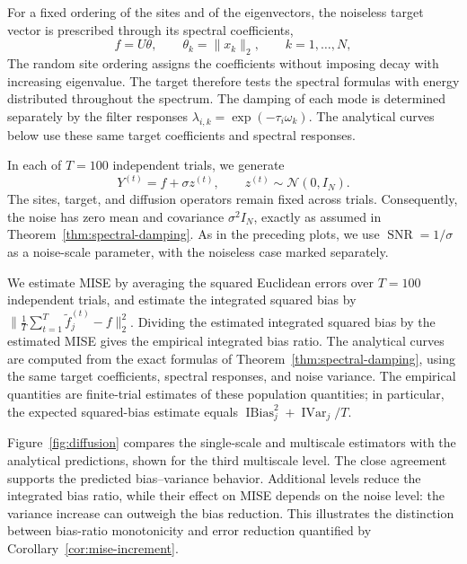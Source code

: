 \documentclass[12pt]{article}
\newcommand{\ibias}{\operatorname{IBias}^2}
\DeclareMathOperator{\ivar}{IVar}
\begin{document}
For a fixed ordering of the sites and of the eigenvectors, the noiseless target vector is prescribed through its spectral coefficients,
\[
f=U\theta,
\qquad
\theta_k=\|x_k\|_2,
\qquad k=1,\ldots,N,
\]
The random site ordering assigns the coefficients without imposing decay with increasing eigenvalue. The target therefore tests the spectral formulas with energy distributed throughout the spectrum. The damping of each mode is determined separately by the filter responses $\lambda_{i,k}=\exp(-\tau_i\omega_k)$. The analytical curves below use these same target coefficients and spectral responses.

In each of $T=100$ independent trials, we generate
\[
Y^{(t)}=f+\sigma z^{(t)},
\qquad z^{(t)}\sim\mathcal N(0,I_N).
\]
The sites, target, and diffusion operators remain fixed across trials. Consequently, the noise has zero mean and covariance $\sigma^2I_N$, exactly as assumed in Theorem~\ref{thm:spectral-damping}. As in the preceding plots, we use $\operatorname{SNR}=1/\sigma$ as a noise-scale parameter, with the noiseless case marked separately.

We estimate MISE by averaging the squared Euclidean errors
over $T=100$ independent trials, and estimate the integrated
squared bias by $\|\frac{1}{T}\sum_{t=1}^{T}\widetilde f_j^{(t)}-f\|_2^2$. Dividing the estimated integrated squared bias by the estimated MISE gives the empirical integrated bias ratio. The analytical curves are computed from the exact formulas
of Theorem~\ref{thm:spectral-damping}, using the same target
coefficients, spectral responses, and noise variance.
The empirical quantities are finite-trial estimates of these
population quantities; in particular, the expected squared-bias
estimate equals $\ibias_j+\ivar_j/T$.

Figure~\ref{fig:diffusion} compares the single-scale and multiscale estimators with the analytical predictions, shown for the
third multiscale level. The close agreement supports the
predicted bias--variance behavior. Additional levels reduce
the integrated bias ratio, while their effect on MISE depends
on the noise level: the variance increase can outweigh the
bias reduction. This illustrates the distinction between
bias-ratio monotonicity and error reduction quantified by
Corollary~\ref{cor:mise-increment}.
\end{document}
